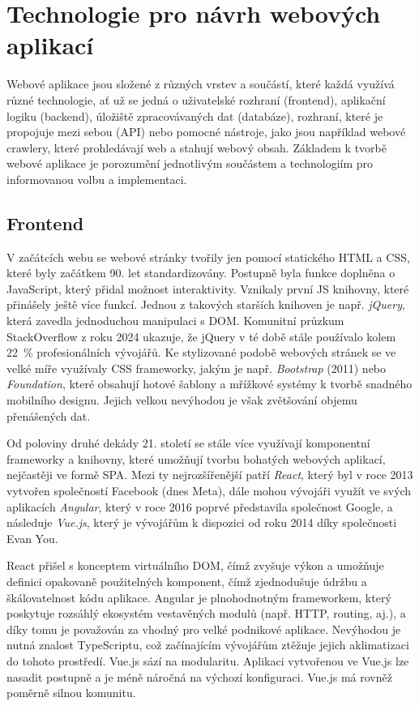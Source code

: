 \chapter{Technologie pro návrh webových aplikací}

Webové aplikace jsou složené z různých vrstev a součástí, které každá
využívá různé technologie, ať už se jedná o uživatelské rozhraní (frontend),
aplikační logiku (backend), úložiště zpracovávaných dat (databáze),
rozhraní, které je propojuje mezi sebou (API) nebo pomocné nástroje,
jako jsou například webové crawlery, které prohledávají web a stahují
webový obsah. Základem k tvorbě webové aplikace je porozumění jednotlivým
součástem a technologiím pro informovanou volbu a implementaci.

\section{Frontend}

V začátcích webu se webové stránky tvořily jen pomocí statického HTML a CSS,
které byly začátkem 90. let standardizovány. Postupně byla funkce doplněna
o JavaScript, který přidal možnost interaktivity. Vznikaly první JS knihovny,
které přinášely ještě více funkcí. Jednou z takových starších knihoven
je např. \emph{jQuery}, která zavedla jednoduchou manipulaci s DOM.
Komunitní průzkum StackOverflow z roku 2024 ukazuje, že jQuery v té době
stále používalo kolem 22~\% profesionálních vývojářů. %
Ke stylizované podobě webových stránek se ve velké míře využívaly CSS
frameworky, jakým je např. \emph{Bootstrap} (2011) nebo \emph{Foundation},
které obsahují hotové šablony a mřížkové systémy k tvorbě snadného mobilního
designu. Jejich velkou nevýhodou je však zvětšování objemu přenášených dat.

Od poloviny druhé dekády 21. století se stále více využívají komponentní
frameworky a knihovny, které umožňují tvorbu bohatých webových aplikací,
nejčastěji ve formě SPA. Mezi ty nejrozšířenější patří \emph{React},
který byl v roce 2013 vytvořen společností Facebook (dnes Meta), dále
mohou vývojáři využít ve svých aplikacích \emph{Angular}, který v roce
2016 poprvé představila společnost Google, a následuje \emph{Vue.js},
který je vývojářům k dispozici od roku 2014 díky společnosti Evan You.

React přišel s konceptem virtuálního DOM, čímž zvyšuje výkon a umožňuje
definici opakovaně použitelných komponent, čímž zjednodušuje údržbu
a škálovatelnost kódu aplikace. %
Angular je plnohodnotným frameworkem, který poskytuje rozsáhlý ekosystém
vestavěných modulů (např. HTTP, routing, aj.), a díky tomu je považován
za vhodný pro velké podnikové aplikace. Nevýhodou je nutná znalost
TypeScriptu, což začínajícím vývojářům ztěžuje jejich aklimatizaci
do tohoto prostředí. %
Vue.js sází na modularitu. Aplikaci vytvořenou ve Vue.js lze nasadit
postupně a je méně náročná na výchozí konfiguraci. Vue.js má rovněž
poměrně silnou komunitu. %

